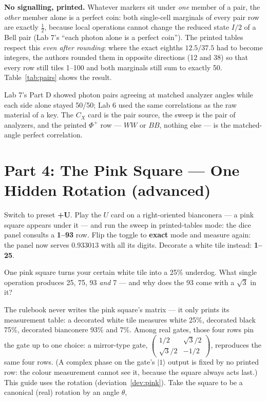 \documentclass[a4paper,11pt]{article}
\providecommand{\ket}[1]{|#1\rangle}
\begin{document}
\begin{theorybox}
\textbf{No signalling, printed.} Whatever markers sit under \emph{one} member of a pair,
the \emph{other} member alone is a perfect coin: both single-cell marginals of every
pair row are exactly $\tfrac12$, because local operations cannot change the reduced
state $I/2$ of a Bell pair (Lab 7's ``each photon alone is a perfect coin''). The
printed tables respect this \emph{even after rounding}: where the exact eighths
$12.5/37.5$ had to become integers, the authors rounded them in opposite directions
(12 and 38) so that every row still tiles 1--100 and both marginals still sum to
exactly 50. Table~\ref{tab:pairs} shows the result.
\end{theorybox}

\begin{connectionbox}
Lab 7's Part D showed photon pairs agreeing at matched analyzer angles while each side
alone stayed 50/50; Lab 6 used the same correlations as the raw material of a key. The
$C_X$ card is the pair source, the sweep is the pair of analyzers, and the printed
$\Phi^+$ row --- $WW$ or $BB$, nothing else --- is the matched-angle perfect correlation.
\end{connectionbox}

\section{Part 4: The Pink Square --- One Hidden Rotation \textnormal{\normalsize(advanced)}}

\begin{playbox}
Switch to preset \textbf{+U}. Play the $U$ card on a right-oriented bianconera --- a pink
square appears under it --- and run the sweep in printed-tables mode: the dice panel
consults a \textbf{1--93} row. Flip the toggle to \textbf{exact} mode and measure again:
the panel now serves $0.933013$ with all its digits. Decorate a white tile instead:
\textbf{1--25}.
\end{playbox}

\begin{questionbox}
One pink square turns your certain white tile into a 25\% underdog. What single
operation produces 25, 75, 93 \emph{and} 7 --- and why does the 93 come with a
$\sqrt{3}$ in it?
\end{questionbox}

The rulebook never writes the pink square's matrix --- it only prints its measurement
table: a decorated white tile measures white 25\%, decorated black 75\%, decorated
bianconere 93\% and 7\%. Among real gates, those four rows pin the gate up to one choice: a
mirror-type gate,
$\left(\begin{smallmatrix} 1/2 & \sqrt{3}/2 \\ \sqrt{3}/2 & -1/2 \end{smallmatrix}\right)$,
reproduces the same four rows. (A complex phase on the gate's $\ket{1}$ output is fixed by no
printed row: the colour measurement cannot see it, because the square always acts last.) This guide uses the rotation (deviation~\ref{dev:pink}). Take the square to be
a canonical (real) rotation by an angle $\theta$,
\end{document}

